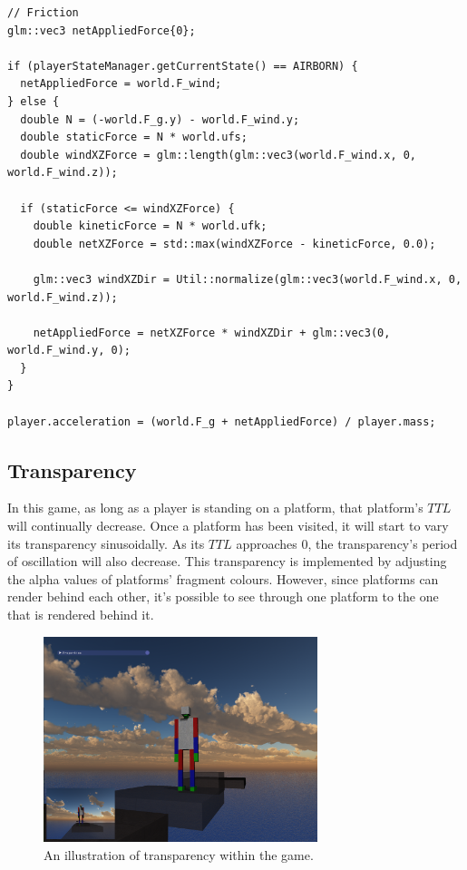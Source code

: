\documentclass[11pt]{report}
\begin{document}
\begin{lstlisting}[caption={Implementation of wind force and kinetic and static friction.}]
// Friction
glm::vec3 netAppliedForce{0};

if (playerStateManager.getCurrentState() == AIRBORN) {
  netAppliedForce = world.F_wind;
} else {
  double N = (-world.F_g.y) - world.F_wind.y;
  double staticForce = N * world.ufs;
  double windXZForce = glm::length(glm::vec3(world.F_wind.x, 0, world.F_wind.z));

  if (staticForce <= windXZForce) {
    double kineticForce = N * world.ufk;
    double netXZForce = std::max(windXZForce - kineticForce, 0.0);

    glm::vec3 windXZDir = Util::normalize(glm::vec3(world.F_wind.x, 0, world.F_wind.z));

    netAppliedForce = netXZForce * windXZDir + glm::vec3(0, world.F_wind.y, 0);
  }
}

player.acceleration = (world.F_g + netAppliedForce) / player.mass;
\end{lstlisting}

\subsection{Transparency}
In this game, as long as a player is standing on a platform, that platform's $TTL$ will continually decrease. Once a platform has been visited, it will start to vary its transparency sinusoidally. As its $TTL$ approaches 0, the transparency's period of oscillation will also decrease. This transparency is implemented by adjusting the alpha values of platforms' fragment colours. However, since platforms can render behind each other, it's possible to see through one platform to the one that is rendered behind it.

\begin{figure}[H]
\includegraphics[width=8cm]{transparency}
\centering
\caption{An illustration of transparency within the game.}
\end{figure}
\end{document}
